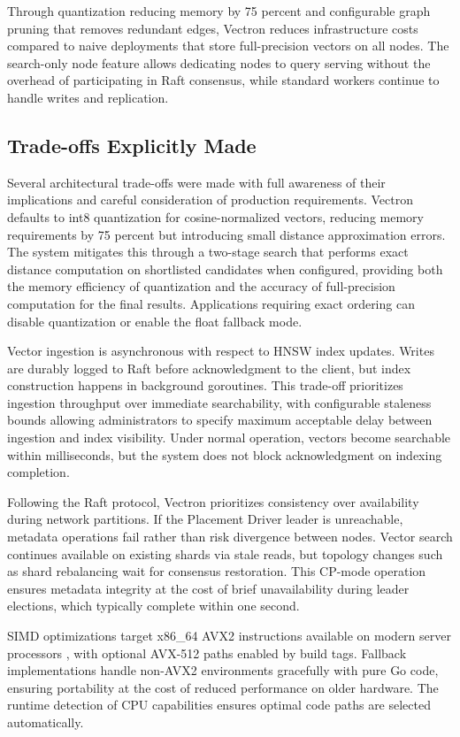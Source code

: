 \documentclass[conference]{IEEEtran}
\begin{document}
Through quantization reducing memory by 75 percent and configurable graph pruning that removes redundant edges, Vectron reduces infrastructure costs compared to naive deployments that store full-precision vectors on all nodes. The search-only node feature allows dedicating nodes to query serving without the overhead of participating in Raft consensus, while standard workers continue to handle writes and replication.

\subsection{Trade-offs Explicitly Made}

Several architectural trade-offs were made with full awareness of their implications and careful consideration of production requirements. Vectron defaults to int8 quantization for cosine-normalized vectors, reducing memory requirements by 75 percent but introducing small distance approximation errors. The system mitigates this through a two-stage search that performs exact distance computation on shortlisted candidates when configured, providing both the memory efficiency of quantization and the accuracy of full-precision computation for the final results. Applications requiring exact ordering can disable quantization or enable the float fallback mode.

Vector ingestion is asynchronous with respect to HNSW index updates. Writes are durably logged to Raft before acknowledgment to the client, but index construction happens in background goroutines. This trade-off prioritizes ingestion throughput over immediate searchability, with configurable staleness bounds allowing administrators to specify maximum acceptable delay between ingestion and index visibility. Under normal operation, vectors become searchable within milliseconds, but the system does not block acknowledgment on indexing completion.

Following the Raft protocol, Vectron prioritizes consistency over availability during network partitions. If the Placement Driver leader is unreachable, metadata operations fail rather than risk divergence between nodes. Vector search continues available on existing shards via stale reads, but topology changes such as shard rebalancing wait for consensus restoration. This CP-mode operation ensures metadata integrity at the cost of brief unavailability during leader elections, which typically complete within one second.

SIMD optimizations target x86\_64 AVX2 instructions available on modern server processors \cite{simd}, with optional AVX-512 paths enabled by build tags. Fallback implementations handle non-AVX2 environments gracefully with pure Go code, ensuring portability at the cost of reduced performance on older hardware. The runtime detection of CPU capabilities ensures optimal code paths are selected automatically.
\end{document}
